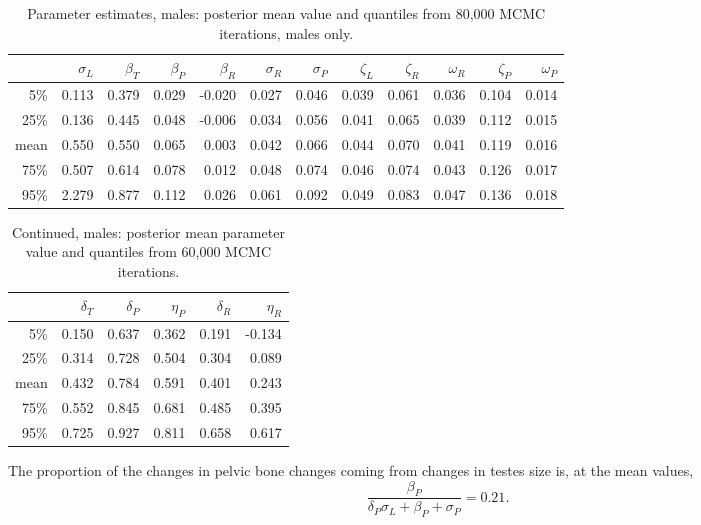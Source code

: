 \documentclass{article}
\begin{document}
\begin{table}[ht]
\centering
\begin{tabular}{rrrrrrrrrrrr}
  \hline
 & $\sigma_L$ & $\beta_T$ & $\beta_P$ & $\beta_R$ & $\sigma_R$ & $\sigma_P$ & $\zeta_L$ & $\zeta_R$ & $\omega_R$ & $\zeta_P$ & $\omega_P$ \\ 
  \hline
5\% & 0.113 & 0.379 & 0.029 & -0.020 & 0.027 & 0.046 & 0.039 & 0.061 & 0.036 & 0.104 & 0.014 \\ 
  25\% & 0.136 & 0.445 & 0.048 & -0.006 & 0.034 & 0.056 & 0.041 & 0.065 & 0.039 & 0.112 & 0.015 \\ 
  mean & 0.550 & 0.550 & 0.065 & 0.003 & 0.042 & 0.066 & 0.044 & 0.070 & 0.041 & 0.119 & 0.016 \\ 
  75\% & 0.507 & 0.614 & 0.078 & 0.012 & 0.048 & 0.074 & 0.046 & 0.074 & 0.043 & 0.126 & 0.017 \\ 
  95\% & 2.279 & 0.877 & 0.112 & 0.026 & 0.061 & 0.092 & 0.049 & 0.083 & 0.047 & 0.136 & 0.018 \\ 
   \hline
\end{tabular}
\caption{Parameter estimates, males: posterior mean value and quantiles from 80,000 MCMC iterations, males only.}
\end{table}



\begin{table}[ht]
\centering
\begin{tabular}{rrrrrr}
  \hline
 & $\delta_T$ & $\delta_P$ & $\eta_P$ & $\delta_R$ & $\eta_R$ \\ 
  \hline
5\% & 0.150 & 0.637 & 0.362 & 0.191 & -0.134 \\ 
  25\% & 0.314 & 0.728 & 0.504 & 0.304 & 0.089 \\ 
  mean & 0.432 & 0.784 & 0.591 & 0.401 & 0.243 \\ 
  75\% & 0.552 & 0.845 & 0.681 & 0.485 & 0.395 \\ 
  95\% & 0.725 & 0.927 & 0.811 & 0.658 & 0.617 \\ 
   \hline
\end{tabular}
\caption{Continued, males: posterior mean parameter value and quantiles from 60,000 MCMC iterations.}
\end{table}

The proportion of the changes in pelvic bone changes coming from changes in testes size is, at the mean values,
\[
\frac{\beta_P}{ \delta_P \sigma_L + \beta_P + \sigma_P } = 0.21 .
\]
\end{document}
